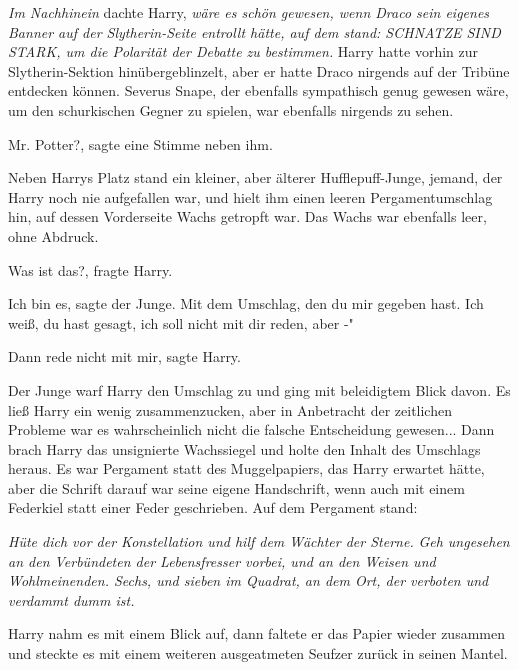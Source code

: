\emph{Im Nachhinein }dachte Harry, \emph{wäre es schön gewesen, wenn Draco sein
eigenes Banner auf der Slytherin-Seite entrollt hätte, auf dem stand: \glqq
SCHNATZE SIND STARK\grqq{}, um die Polarität der Debatte zu bestimmen.} Harry
hatte vorhin zur Slytherin-Sektion hinübergeblinzelt, aber er hatte Draco
nirgends auf der Tribüne entdecken können. Severus Snape, der ebenfalls
sympathisch genug gewesen wäre, um den schurkischen Gegner zu spielen, war
ebenfalls nirgends zu sehen.

\glqq Mr. Potter?\grqq{}, sagte eine Stimme neben ihm.

Neben Harrys Platz stand ein kleiner, aber älterer Hufflepuff-Junge, jemand, der
Harry noch nie aufgefallen war, und hielt ihm einen leeren Pergamentumschlag
hin, auf dessen Vorderseite Wachs getropft war. Das Wachs war ebenfalls leer,
ohne Abdruck.

\glqq Was ist das?\grqq{}, fragte Harry.

\glqq Ich bin es\grqq{}, sagte der Junge. \glqq Mit dem Umschlag, den du mir
gegeben hast. Ich weiß, du hast gesagt, ich soll nicht mit dir reden, aber -"

\glqq Dann rede nicht mit mir\grqq{}, sagte Harry.

Der Junge warf Harry den Umschlag zu und ging mit beleidigtem Blick davon. Es
ließ Harry ein wenig zusammenzucken, aber in Anbetracht der zeitlichen Probleme
war es wahrscheinlich nicht die falsche Entscheidung gewesen... Dann brach Harry
das unsignierte Wachssiegel und holte den Inhalt des Umschlags heraus. Es war
Pergament statt des Muggelpapiers, das Harry erwartet hätte, aber die Schrift
darauf war seine eigene Handschrift, wenn auch mit einem Federkiel statt einer
Feder geschrieben. Auf dem Pergament stand:

\emph{Hüte dich vor der Konstellation und hilf dem Wächter der Sterne.}
\emph{Geh ungesehen an den Verbündeten der Lebensfresser vorbei, und an den
Weisen und Wohlmeinenden. Sechs, und sieben im Quadrat, an dem Ort, der verboten
und verdammt dumm ist.}

Harry nahm es mit einem Blick auf, dann faltete er das Papier wieder zusammen
und steckte es mit einem weiteren ausgeatmeten Seufzer zurück in seinen Mantel.

